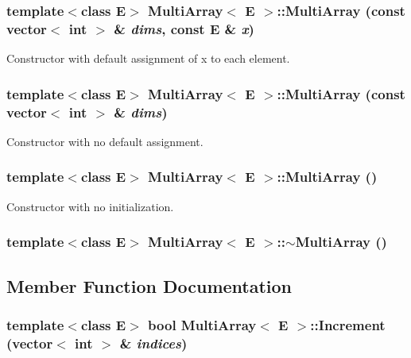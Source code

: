 \subsubsection{\setlength{\rightskip}{0pt plus 5cm}template$<$class E$>$ Multi\-Array$<$ E $>$::Multi\-Array (const vector$<$ int $>$ \& {\em dims}, const E \& {\em x})}\label{classMultiArray_a0}


Constructor with default assignment of x to each element.

\subsubsection{\setlength{\rightskip}{0pt plus 5cm}template$<$class E$>$ Multi\-Array$<$ E $>$::Multi\-Array (const vector$<$ int $>$ \& {\em dims})}\label{classMultiArray_a1}


Constructor with no default assignment.

\subsubsection{\setlength{\rightskip}{0pt plus 5cm}template$<$class E$>$ Multi\-Array$<$ E $>$::Multi\-Array ()\hspace{0.3cm}{\tt  [inline]}}\label{classMultiArray_a2}


Constructor with no initialization.

\subsubsection{\setlength{\rightskip}{0pt plus 5cm}template$<$class E$>$ Multi\-Array$<$ E $>$::$\sim$Multi\-Array ()\hspace{0.3cm}{\tt  [inline]}}\label{classMultiArray_a3}




\subsection{Member Function Documentation}
\subsubsection{\setlength{\rightskip}{0pt plus 5cm}template$<$class E$>$ bool Multi\-Array$<$ E $>$::Increment (vector$<$ int $>$ \& {\em indices})\hspace{0.3cm}{\tt  [inline]}}\label{classMultiArray_a5}


